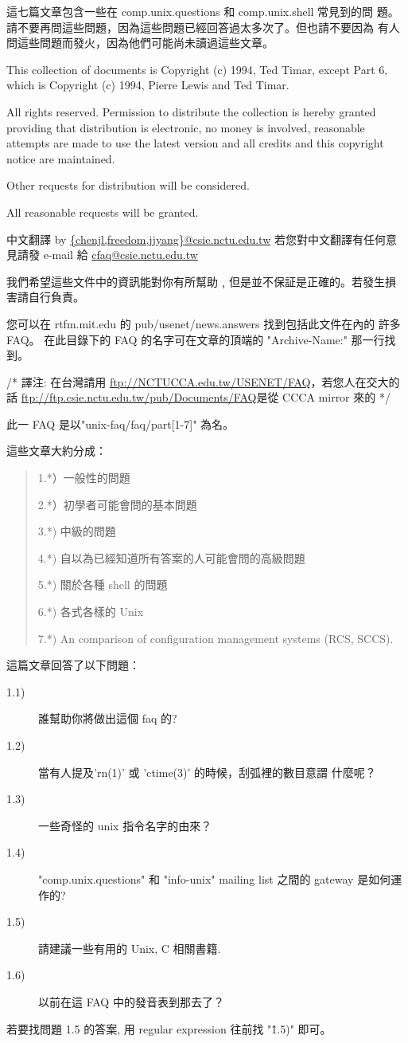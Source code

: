 \documentclass{letter}
\begin{document}
\begin{CJK}{Bg5}{ming} 
這七篇文章包含一些在 comp.unix.questions 和 comp.unix.shell 常見到的問
題。請不要再問這些問題，因為這些問題已經回答過太多次了。但也請不要因為
有人問這些問題而發火，因為他們可能尚未讀過這些文章。

This collection of documents is Copyright (c) 1994, Ted Timar, except 
Part 6, which is Copyright (c) 1994, Pierre Lewis and Ted Timar.

All rights reserved. Permission to distribute the collection is 
hereby granted providing that distribution is electronic, no money is 
involved, reasonable attempts are made to use the latest version and 
all credits and this copyright notice are maintained.

Other requests for distribution will be considered.

All reasonable requests will be granted.

中文翻譯 by \url{{chenjl,freedom,jjyang}@csie.nctu.edu.tw}
若您對中文翻譯有任何意見請發 e-mail 給 \url{cfaq@csie.nctu.edu.tw}

我們希望這些文件中的資訊能對你有所幫助﹐但是並不保証是正確的。若發生損
害請自行負責。

您可以在 rtfm.mit.edu 的 pub/usenet/news.answers 找到包括此文件在內的
許多 FAQ。 在此目錄下的 FAQ 的名字可在文章的頂端的 "Archive-Name:" 
那一行找到。

/* 譯注: 在台灣請用 \url{ftp://NCTUCCA.edu.tw/USENET/FAQ}，若您人在交大的話 
         \url{ftp://ftp.csie.nctu.edu.tw/pub/Documents/FAQ}是從 CCCA mirror 
來的 */

此一 FAQ 是以"unix-faq/faq/part[1-7]" 為名。

這些文章大約分成：
\begin{quote}
      1.*）一般性的問題

      2.*）初學者可能會問的基本問題

      3.*) 中級的問題

      4.*) 自以為已經知道所有答案的人可能會問的高級問題

      5.*) 關於各種 shell 的問題

      6.*) 各式各樣的 Unix

      7.*) An comparison of configuration management systems (RCS, SCCS).

\end{quote}

這篇文章回答了以下問題：
\begin{description}
      \item [1.1)] 誰幫助你將做出這個 faq 的?
      \item [1.2)]  當有人提及'rn(1)' 或 'ctime(3)' 的時候，刮弧裡的數目意謂
	    什麼呢？
      \item [1.3)]  一些奇怪的 unix 指令名字的由來？
      \item [1.4)]  "comp.unix.questions" 和 "info-unix" mailing list 之間的
	    gateway 是如何運作的?
      \item [1.5)]  請建議一些有用的 Unix, C 相關書籍.
      \item [1.6)]  以前在這 FAQ 中的發音表到那去了？
\end{description}
若要找問題 1.5 的答案, 用 regular expression 往前找 "\^1.5)" 即可。


\end{CJK}
\end{document}
